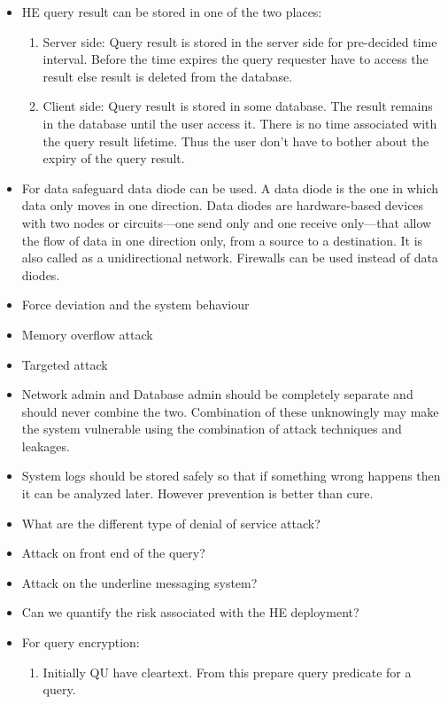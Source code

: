 \begin{itemize}
\begin{enumerate}
          \end{enumerate}
    \item HE query result can be stored in one of the two places:
          \begin{enumerate}
              \item Server side: Query result is stored in the server side for pre-decided time interval. Before the time expires the query requester have to access the result else result is deleted from the database.
              \item Client side: Query result is stored in some database. The result remains in the database until the user access it. There is no time associated with the query result lifetime. Thus the user don't have to bother about the expiry of the query result.
          \end{enumerate}
    \item For data safeguard data diode can be used. A data diode is the one in which data only moves in one direction. Data diodes are hardware-based devices with two nodes or circuits—one send only and one receive only—that allow the flow of data in one direction only, from a source to a destination. It is also called as a unidirectional network. Firewalls can be used instead of data diodes.
    \item Force deviation and the system behaviour
    \item Memory overflow attack
    \item Targeted attack
    \item Network admin and Database admin should be completely separate and should never combine the two. Combination of these unknowingly may make the system vulnerable using the combination of attack techniques and leakages.
    \item System logs should be stored safely so that if something wrong happens then it can be analyzed later. However prevention is better than cure.
    \item What are the different type of denial of service attack?
    \item Attack on front end of the query?
    \item Attack on the underline messaging system?
    \item Can we quantify the risk associated with the HE deployment?
    \item For query encryption:
          \begin{enumerate}
              \item Initially QU have cleartext. From this prepare query predicate for a query.

\end{enumerate}
\end{itemize}

